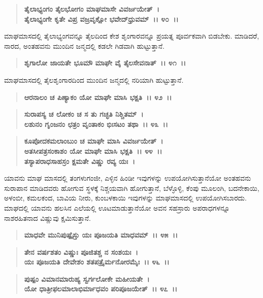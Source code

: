 \begin{verse}
\textbf{ತೈಲಾಭ್ಯಂಗಂ ತೈಲಭೋಗಂ ಮಾಘಮಾಸೇ ವಿವರ್ಜಯೇತ್~।}\\\textbf{ತೈಲಾಭ್ಯಂಗೇ ಕೃತೇ ವಿಪ್ರ ವಜ್ರವೃಕ್ಷೋ ಭವೇದ್‌ಧ್ರುವಮ್~।। ೪೦~।।}
\end{verse}

ಮಾಘಮಾಸದಲ್ಲಿ ತೈಲಾಭ್ಯಂಗವನ್ನೂ ತೈಲದಿಂದ ಕೇಶ ಶೃಂಗಾರವನ್ನೂ ಪ್ರಯತ್ನ ಪೂರ್ವಕವಾಗಿ ಬಿಡಬೇಕು. ಮಾಡಿದರೆ, ನಾರದ, ಅಂತಹವನು ಮುಂದಿನ ಜನ್ಮದಲ್ಲಿ ಕಡಲೇ ಗಿಡವಾಗಿ ಹುಟ್ಟುತ್ತಾನೆ.

\begin{verse}
\textbf{ಶೃಗಾಲೋ ಜಾಯತೇ ಭೂಮೌ ಮಾಘೇ ವೈ ತೈಲಸೇವನಾತ್~।। ೪೧~।।}
\end{verse}

ಮಾಘಮಾಸದಲ್ಲಿ ತೈಲಶೃಂಗಾರದಿಂದ ಮುಂದಿನ ಜನ್ಮದಲ್ಲಿ ನರಿಯಾಗಿ ಹುಟ್ಟುತ್ತಾನೆ.

\begin{verse}
\textbf{ಆರನಾಲಂ ಚ ಪಿಣ್ಯಾಕಂ ಯೋ ಮಾಘೇ ಮಾಸಿ ಭಕ್ಷತಿ~।। ೪೨~।।}
\end{verse}

\begin{verse}
\textbf{ಸುರಾಪಸ್ಯ ಚ ಲೋಕಂ ಚ ಸ ತು ಗಚ್ಛತಿ ನಿಶ್ಚಿತಮ್~।}\\\textbf{ಲಶುನಂ ಗೃಂಜನಂ ಛತ್ರಂ ವೃಂತಾಕಂ ಭಿಃಸಟಂ ತಥಾ~।। ೪೩~।। }
\end{verse}

\begin{verse}
\textbf{ಕೂಪೋದಕಮಲಾಂಬುಂ ಚ ಮಾಘೇ ಮಾಸಿ ವಿವರ್ಜಯೇತ್~।}\\\textbf{ಅತಸೀಪತ್ರಸಂಕಾಶಂ ಯೋ ಮಾಘೇ ಮಾಸಿ ಭಕ್ಷತಿ~।। ೪೪~।। }\\\textbf{ತಸ್ಯಾಪರಾಧಸಾಹಸ್ರಂ ಕ್ಷಮತೇ ವಿಷ್ಣು ರವ್ಯ ಯಃ~।}
\end{verse}

ಯಾವನು ಮಾಘ ಮಾಸದಲ್ಲಿ ತಂಗಳುಗಂಜೀ, ಎಳ್ಳಿನ ಹಿಂಡೀ ಇವುಗಳನ್ನು ಉಪಯೋಗಿಸುತ್ತಾನೆಯೋ ಅಂತಹವನು ಸುರಾಪಾನ ಮಾಡಿದವರು ಹೋಗುವ ಸ್ಥಳಕ್ಕೆ ನಿಶ್ಚಯವಾಗಿ ಹೋಗುತ್ತಾನೆ, ಬೆಳ್ಳೊಳ್ಳಿ, ಕೆಂಪು ಮೂಲಂಗಿ, ಬದನೇಕಾಯಿ, ಅಳಂಬೀ, ಕಮಲಕಂದ, ಬಾವಿಯ ನೀರು, ಕುಂಬಳಕಾಯಿ ಇವುಗಳನ್ನು ಮಾಘಮಾಸದಲ್ಲಿ ಉಪಯೋಗಿಸಬಾರದು. ಮಾಘದಲ್ಲಿ ಯಾವನು ಹಲಸಿನ ಎಲೆಯಲ್ಲಿ ಊಟಮಾಡುತ್ತಾನೆಯೋ ಅವನ ಸಹಸ್ರಾರು ಅಪರಾಧಗಳನ್ನೂ ನಾಶರಹಿತನಾದ ವಿಷ್ಣುವು ಕ್ಷಮಿಸುತ್ತಾನೆ.

\begin{verse}
\textbf{ಮಾಧವೇ ಮುನಿಪುಷ್ಪೈಸ್ತು ಯಃ ಪೂಜಯತಿ ಮಾಧವಮ್~।। ೪೫~।। }
\end{verse}

\begin{verse}
\textbf{ತೇನ ವರ್ಷಶತಂ ವಿಷ್ಣುಃ ಪೂಜಿತಶ್ಚ ನ ಸಂಶಯಃ~।}\\\textbf{ಯಃ ಪೂಜಯತಿ ದೇವೇಶಂ ಶತಪತ್ರೈರ್ಮನೋರಮೈಃ~।। ೪೬~।। }
\end{verse}

\begin{verse}
\textbf{ಪುಷ್ಪಂ ವಿಮಾನಮಾರುಹ್ಯ ಸ್ವರ್ಗಲೋಕೇ ಮಹೀಯತೇ~।}\\\textbf{ಯೋ ಧಾತ್ರೀಫಲಮಾಲಾಭಿರ್ಮಾಧವಂ ಪರಿಪೂಜಯೇತ್~।। ೪೭~।। }
\end{verse}

